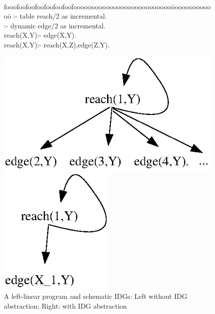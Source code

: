 \begin{figure}[ht]
\centering
\begin{minipage}[b]{0.25\linewidth}
{\tt
\begin{tabbing}
fooofoofoofoofoofoofoofooooooooooooooooooooooooooo\=ooooooooooooo\=\kill
:- table reach/2 as incremental.\\
:- dynamic edge/2 as incremental.\\
reach(X,Y):- edge(X,Y). \\
 reach(X,Y):- reach(X,Z),edge(Z,Y). \\
\end{tabbing}
}
\end{minipage}
\begin{minipage}[b]{0.25\linewidth}
\includegraphics[width=\textwidth]{recursion}
\end{minipage}
\quad
\begin{minipage}[b]{0.25\linewidth}
\includegraphics[width=0.5\textwidth]{abs-recursion}
\end{minipage}
\caption{A left-linear program and schematic IDGs: Left
  without IDG abstraction; Right: with
  IDG abstraction} \label{fig:abstraction}
\end{figure}
